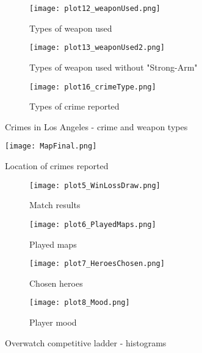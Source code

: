 \documentclass{article}
\begin{document}
\begin{figure}
\centering
\begin{subfigure}[b]{0.85\textwidth}
\texttt{[image: plot12\_weaponUsed.png]}
\caption{Types of weapon used}
\label{fig:we_us}
\end{subfigure}

\begin{subfigure}[b]{0.85\textwidth}
\texttt{[image: plot13\_weaponUsed2.png]}
\caption{Types of weapon used without "Strong-Arm"}
\label{fig:we_us2}
\end{subfigure}
    
\begin{subfigure}[b]{0.85\textwidth}
\texttt{[image: plot16\_crimeType.png]}
\caption{Types of crime reported}
\label{fig:cr_ty}
\end{subfigure}
\caption{Crimes in Los Angeles - crime and weapon types}\label{fig:clcwt}
\end{figure}

\begin{figure}
\centering
\texttt{[image: MapFinal.png]}
\caption{Location of crimes reported}
\label{fig:map}
\end{figure}

\begin{figure}
\centering
\begin{subfigure}[b]{0.45\textwidth}
\texttt{[image: plot5\_WinLossDraw.png]}
\caption{Match results}
\label{fig:ma_re}
\end{subfigure}
\begin{subfigure}[b]{0.45\textwidth}
\texttt{[image: plot6\_PlayedMaps.png]}
\caption{Played maps}
\label{fig:pl_ma}
\end{subfigure}
    
\begin{subfigure}[b]{0.45\textwidth}
\texttt{[image: plot7\_HeroesChosen.png]}
\caption{Chosen heroes}
\label{fig:ch_he}
\end{subfigure}
\begin{subfigure}[b]{0.45\textwidth}
\texttt{[image: plot8\_Mood.png]}
\caption{Player mood}
\label{fig:pl_mo}
\end{subfigure}
\caption{Overwatch competitive ladder - histograms}\label{fig:oclh}
\end{figure}
\end{document}
